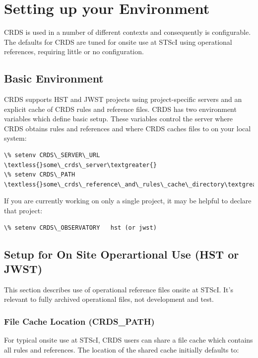 \documentclass[letterpaper,10pt,english]{sphinxmanual}
\begin{document}
\chapter{Setting up your Environment}
\label{installation:setting-up-your-environment}
CRDS is used in a number of different contexts and consequently is configurable.   The defaults for
CRDS are tuned for onsite use at STScI using operational references,  requiring little or no configuration.


\section{Basic Environment}
\label{installation:basic-environment}
CRDS supports HST and JWST projects using project-specific servers and an explicit cache of CRDS rules and reference
files.   CRDS has two environment variables which define basic setup.   These variables control the server where CRDS
obtains rules and references and where CRDS caches files to on your local system:

\begin{Verbatim}[commandchars=\\\{\}]
\% setenv CRDS\_SERVER\_URL  \textless{}some\_crds\_server\textgreater{}
\% setenv CRDS\_PATH        \textless{}some\_crds\_reference\_and\_rules\_cache\_directory\textgreater{}
\end{Verbatim}

If you are currently working on only a single project,  it may be helpful to declare that project:

\begin{Verbatim}[commandchars=\\\{\}]
\% setenv CRDS\_OBSERVATORY   hst (or jwst)
\end{Verbatim}


\section{Setup for On Site Operartional Use (HST or JWST)}
\label{installation:setup-for-on-site-operartional-use-hst-or-jwst}
This section describes use of operational reference files onsite at STScI.  It's relevant to fully archived
operational files,  not development and test.


\subsection{File Cache Location (CRDS\_PATH)}
\label{installation:file-cache-location-crds-path}
For typical onsite use at STScI, CRDS users can share a file cache which contains all rules and references.  The
location of the shared cache initially defaults to:
\end{document}

